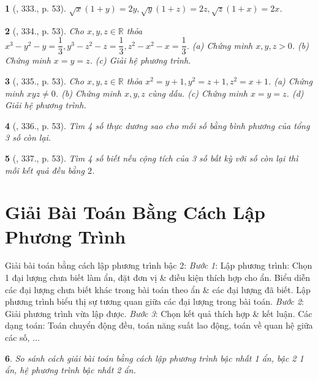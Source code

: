 \documentclass{article}
\newtheorem{baitoan}{}
\begin{document}
\begin{baitoan}[\cite{Binh_Toan_9_tap_2}, 333., p. 53]
	$\sqrt{x}(1 + y) = 2y,\sqrt{y}(1 + z) = 2z,\sqrt{z}(1 + x) = 2x$.
\end{baitoan}

\begin{baitoan}[\cite{Binh_Toan_9_tap_2}, 334., p. 53]
	Cho $x,y,z\in\mathbb{R}$ thỏa $x^3 - y^2 - y = \dfrac{1}{3},y^3 - z^2 - z = \dfrac{1}{3},z^2 - x^2 - x = \dfrac{1}{3}$. (a) Chứng minh $x,y,z > 0$. (b) Chứng minh $x = y = z$. (c) Giải hệ phương trình.
\end{baitoan}

\begin{baitoan}[\cite{Binh_Toan_9_tap_2}, 335., p. 53]
	Cho $x,y,z\in\mathbb{R}$ thỏa $x^2 = y + 1,y^2 = z + 1,z^2 = x + 1$. (a) Chứng minh $xyz\ne0$. (b) Chứng minh $x,y,z$ cùng dấu. (c) Chứng minh $x = y = z$. (d) Giải hệ phương trình.
\end{baitoan}

\begin{baitoan}[\cite{Binh_Toan_9_tap_2}, 336., p. 53]
	Tìm 4 số thực dương sao cho mỗi số bằng bình phương của tổng 3 số còn lại.
\end{baitoan}

\begin{baitoan}[\cite{Binh_Toan_9_tap_2}, 337., p. 53]
	Tìm 4 số biết nếu cộng tích của 3 số bất kỳ với số còn lại thì mỗi kết quả đều bằng $2$.
\end{baitoan}


\section{Giải Bài Toán Bằng Cách Lập Phương Trình}
 {\sf Giải bài toán bằng cách lập phương trình bậc 2}: \textit{Bước 1}: Lập phương trình: Chọn 1 đại lượng chưa biết làm ẩn, đặt đơn vị \& điều kiện thích hợp cho ẩn. Biểu diễn các đại lượng chưa biết khác trong bài toán theo ẩn \& các đại lượng đã biết. Lập phương trình biểu thị sự tương quan giữa các đại lượng trong bài toán. \textit{Bước 2}: Giải phương trình vừa lập được. \textit{Bước 3}: Chọn kết quả thích hợp \& kết luận.  Các dạng toán: Toán chuyển động đều, toán năng suất lao động, toán về quan hệ giữa các số, $\ldots$

\begin{baitoan}
	So sánh cách giải bài toán bằng cách lập phương trình bậc nhất 1 ẩn, bậc 2 1 ẩn, hệ phương trình bậc nhất 2 ẩn.
\end{baitoan}
\end{document}
